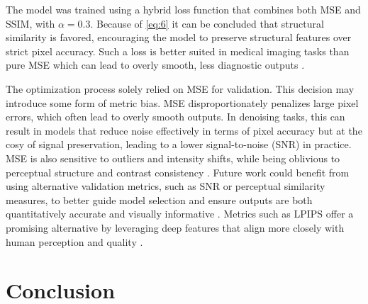 \documentclass[twocolumn]{article}
\begin{document}
 The model was trained using a hybrid loss function that combines both MSE and SSIM, with  $\alpha=0.3$. Because of \ref{eq:6} it can be concluded that structural similarity is favored, encouraging the model to preserve structural features over strict pixel accuracy. Such a loss is better suited in medical imaging tasks than pure MSE which can lead to overly smooth, less diagnostic outputs \cite{Dastmalchi}. 

 The optimization process solely relied on MSE for validation. This decision may introduce some form of metric bias. MSE disproportionately penalizes large pixel errors, which often lead to overly smooth outputs. In denoising tasks, this can result in models that reduce noise effectively in terms of pixel accuracy but at the cosy of signal preservation, leading to a lower signal-to-noise (SNR) in practice. MSE is also sensitive to outliers and intensity shifts, while being oblivious to perceptual structure and contrast consistency \cite{1284395}. Future work could benefit from using alternative validation metrics, such as SNR or perceptual similarity measures, to better guide model selection and ensure outputs are both quantitatively accurate and visually informative \cite{SNR-validation}. Metrics such as LPIPS offer a promising alternative by leveraging deep features that align more closely with human perception and quality \cite{zhang2018unreasonableeffectivenessdeepfeatures}.




\section{Conclusion}

\newpage
\nocite{*}
\printbibliography
{}
\end{document}
